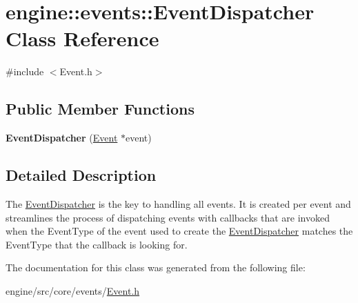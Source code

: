 \hypertarget{classengine_1_1events_1_1EventDispatcher}{}\section{engine\+:\+:events\+:\+:Event\+Dispatcher Class Reference}
\label{classengine_1_1events_1_1EventDispatcher}


{\ttfamily \#include $<$Event.\+h$>$}

\subsection*{Public Member Functions}
\begin{DoxyCompactItemize}
\item 
\mbox{\label{classengine_1_1events_1_1EventDispatcher_a1a599ea2862fbf8ccff7510b3d1356f0}} 
{\bfseries Event\+Dispatcher} (\hyperlink{classengine_1_1events_1_1Event}{Event} $\ast$event)
\end{DoxyCompactItemize}


\subsection{Detailed Description}
The \hyperlink{classengine_1_1events_1_1EventDispatcher}{Event\+Dispatcher} is the key to handling all events. It is created per event and streamlines the process of dispatching events with callbacks that are invoked when the Event\+Type of the event used to create the \hyperlink{classengine_1_1events_1_1EventDispatcher}{Event\+Dispatcher} matches the Event\+Type that the callback is looking for. 

The documentation for this class was generated from the following file\+:\begin{DoxyCompactItemize}
\item 
engine/src/core/events/\hyperlink{Event_8h}{Event.\+h}\end{DoxyCompactItemize}
